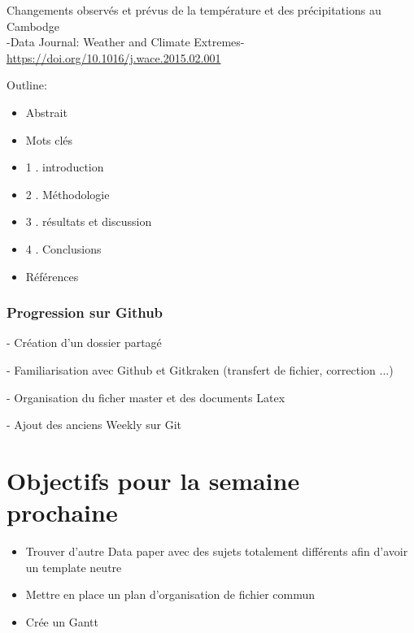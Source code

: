 \documentclass[11pt,oneside]{article}
\begin{document}
\begin{center}
Changements observés et prévus de la température et des précipitations au Cambodge\\
-Data Journal: Weather and Climate Extremes-\\
\url {https://doi.org/10.1016/j.wace.2015.02.001}
\end{center}
\noindent Outline:
\begin{itemize}
\item Abstrait
\item Mots clés
\item 1 . introduction
\item 2 . Méthodologie
\item 3 . résultats et discussion
\item 4 . Conclusions
\item Références
\end{itemize}




\newpage
\onecolumn

\section*{Progression sur Github}
- Création d'un dossier partagé

- Familiarisation avec Github et Gitkraken (transfert de fichier, correction ...)

- Organisation du ficher master et des documents Latex

- Ajout des anciens Weekly sur Git


\newpage
\part*{Objectifs pour la semaine prochaine}
\begin{itemize}
	\item Trouver d'autre Data paper avec des sujets totalement différents afin d'avoir un template neutre
	\item Mettre en place un plan d'organisation de fichier commun
	\item Crée un Gantt
	

\end{itemize}
\end{document}
